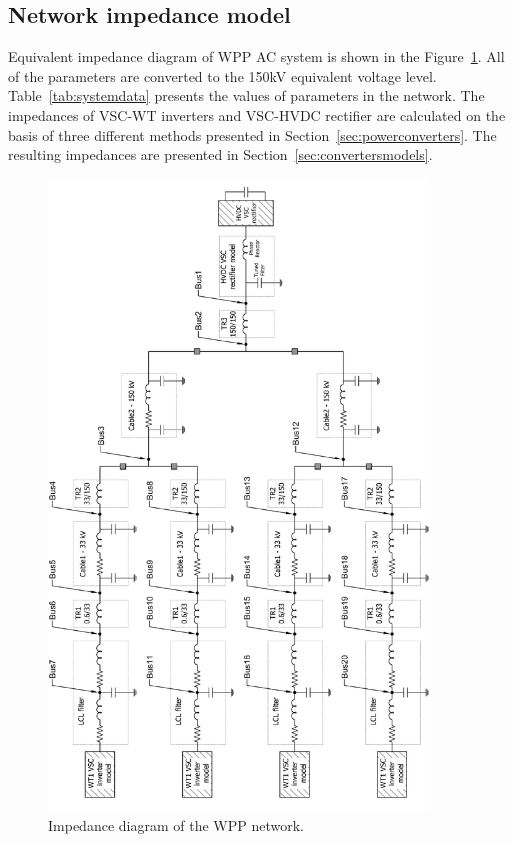 \documentclass[12pt]{report} %
\begin{document}
\subsection{Network impedance model}
Equivalent impedance diagram of WPP AC system is shown in the Figure~\ref{fig:systemcase3}. All of the parameters are converted to the 150kV equivalent voltage level. Table~\ref{tab:systemdata} presents the values of parameters in the network. The impedances of VSC-WT inverters and VSC-HVDC rectifier are calculated on the basis of three different methods presented in Section~\ref{sec:powerconverters}. The resulting impedances are presented in Section~\ref{sec:convertersmodels}.

\begin{figure}[htb]
	\centering
	\includegraphics[width=0.9\textwidth]{img/Case3/system_case3.png}
  	\caption{Impedance diagram of the WPP network.}
  	\label{fig:systemcase3}
\end{figure}
\FloatBarrier
\end{document}

